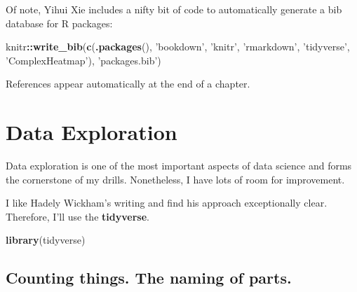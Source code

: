 \documentclass[]{book}
\newenvironment{Shaded}{\begin{snugshade}}{\end{snugshade}}
\newcommand{\DataTypeTok}[1]{\textcolor[rgb]{0.13,0.29,0.53}{#1}}
\newcommand{\DecValTok}[1]{\textcolor[rgb]{0.00,0.00,0.81}{#1}}
\newcommand{\KeywordTok}[1]{\textcolor[rgb]{0.13,0.29,0.53}{\textbf{#1}}}
\newcommand{\NormalTok}[1]{#1}
\newcommand{\OperatorTok}[1]{\textcolor[rgb]{0.81,0.36,0.00}{\textbf{#1}}}
\newcommand{\OtherTok}[1]{\textcolor[rgb]{0.56,0.35,0.01}{#1}}
\newcommand{\StringTok}[1]{\textcolor[rgb]{0.31,0.60,0.02}{#1}}
\begin{document}
Of note, Yihui Xie includes a nifty bit of code to automatically generate a bib database for R packages:

\begin{Shaded}
\begin{Highlighting}[]
\NormalTok{knitr}\OperatorTok{::}\KeywordTok{write_bib}\NormalTok{(}\KeywordTok{c}\NormalTok{(}\KeywordTok{.packages}\NormalTok{(), }\StringTok{'bookdown'}\NormalTok{, }\StringTok{'knitr'}\NormalTok{, }\StringTok{'rmarkdown'}\NormalTok{, }\StringTok{'tidyverse'}\NormalTok{, }\StringTok{'ComplexHeatmap'}\NormalTok{), }\StringTok{'packages.bib'}\NormalTok{)}
\end{Highlighting}
\end{Shaded}

References appear automatically at the end of a chapter.

\hypertarget{dataexploration}{%
\chapter{Data Exploration}\label{dataexploration}}

Data exploration is one of the most important aspects of data science and forms the cornerstone of my drills. Nonetheless, I have lots of room for improvement.

I like Hadely Wickham's writing and find his approach exceptionally clear. Therefore, I'll use the \textbf{tidyverse}.

\begin{Shaded}
\begin{Highlighting}[]
\KeywordTok{library}\NormalTok{(tidyverse)}
\end{Highlighting}
\end{Shaded}

\hypertarget{counting-things.-the-naming-of-parts.}{%
\section{Counting things. The naming of parts.}\label{counting-things.-the-naming-of-parts.}}

\begin{Shaded}
\end{Shaded}
\end{document}
